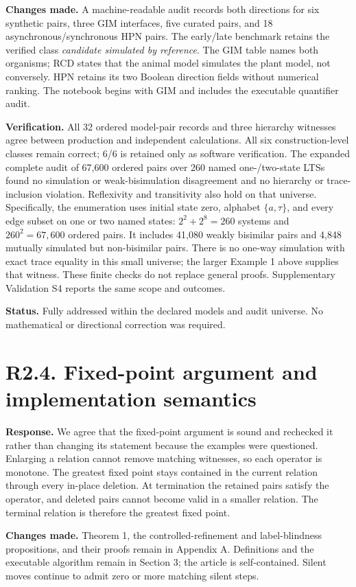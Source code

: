 \documentclass[11pt]{article}
\begin{document}
\textbf{Changes made.} A machine-readable audit records both directions for six
synthetic pairs, three GIM interfaces, five curated pairs, and 18
asynchronous/synchronous HPN pairs. The early/late benchmark retains the verified
class \emph{candidate simulated by reference}. The GIM table names both organisms;
RCD states that the animal model simulates the plant model, not conversely.
HPN retains its two Boolean direction fields without numerical ranking.
The notebook begins with GIM and includes the executable quantifier audit.

\textbf{Verification.} All 32 ordered model-pair records and three hierarchy
witnesses agree between production and independent calculations. All six
construction-level classes remain correct; 6/6 is retained only as software
verification. The expanded complete audit of 67,600 ordered pairs over 260
named one-/two-state LTSs found no simulation or weak-bisimulation disagreement
and no hierarchy or trace-inclusion violation. Reflexivity and transitivity
also hold on that universe. Specifically, the enumeration uses initial state
zero, alphabet $\{a,\tau\}$, and every edge subset on one or two named states:
$2^2+2^8=260$ systems and $260^2=67{,}600$ ordered pairs. It includes
41,080 weakly bisimilar pairs and 4,848 mutually simulated but non-bisimilar
pairs. There is no one-way simulation with exact trace equality in this small
universe; the larger Example 1 above supplies that witness. These finite
checks do not replace general proofs. Supplementary Validation S4 reports
the same scope and outcomes.

\textbf{Status.} Fully addressed within the declared models and audit universe.
No mathematical or directional correction was required.

\section*{R2.4. Fixed-point argument and implementation semantics}
\textbf{Response.} We agree that the fixed-point argument is sound and
rechecked it rather than changing its statement because the examples were
questioned. Enlarging a relation cannot remove matching witnesses, so each
operator is monotone. The greatest fixed point stays contained in the current
relation through every in-place deletion. At termination the retained pairs
satisfy the operator, and deleted pairs cannot become valid in a smaller
relation. The terminal relation is therefore the greatest fixed point.

\textbf{Changes made.} Theorem 1, the controlled-refinement and label-blindness
propositions, and their proofs remain in Appendix A. Definitions and the
executable algorithm remain in Section 3; the article is self-contained.
Silent moves continue to admit zero or more matching silent steps.
\end{document}
